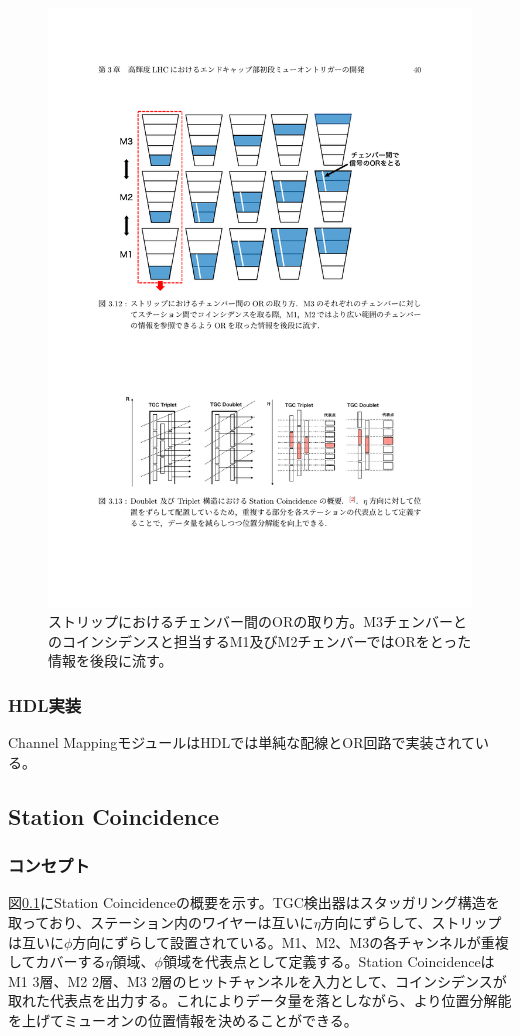 \begin{figure} 
\centering
\includegraphics[width=16cm]{fig/SL/Channel_Mapping.pdf}
\caption[]{ストリップにおけるチェンバー間のORの取り方。M3チェンバーとのコインシデンスと担当するM1及びM2チェンバーではORをとった情報を後段に流す。\cite{mt_kawamoto}}
\label{fig_CTA}
\end{figure}

\subsubsection*{HDL実装}
Channel MappingモジュールはHDLでは単純な配線とOR回路で実装されている。

\subsection{Station Coincidence}
\subsubsection*{コンセプト}
図\ref{}にStation Coincidenceの概要を示す。TGC検出器はスタッガリング構造を取っており、ステーション内のワイヤーは互いに$\eta$方向にずらして、ストリップは互いに$\phi$方向にずらして設置されている。M1、M2、M3の各チャンネルが重複してカバーする$\eta$領域、$\phi$領域を代表点として定義する。Station CoincidenceはM1 3層、M2 2層、M3 2層のヒットチャンネルを入力として、コインシデンスが取れた代表点を出力する。これによりデータ量を落としながら、より位置分解能を上げてミューオンの位置情報を決めることができる。

